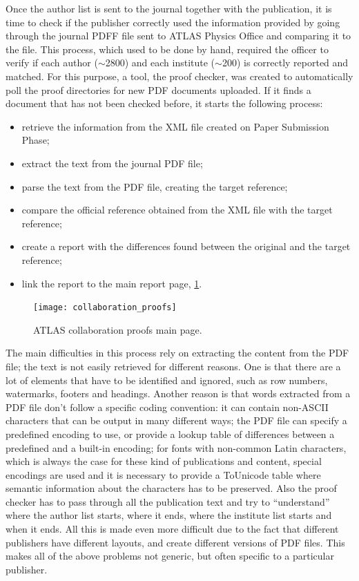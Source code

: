 Once the author list is sent to the journal together with the publication,
it is time to check if the publisher correctly used the information provided by going through the journal PDFF file sent to ATLAS Physics Office and comparing it to the  file.
This process, which used to be done by hand, required the officer to verify if each author ($\sim$2800) and each institute ($\sim$200) is correctly reported and matched. 
For this purpose, a tool, the proof checker, was created to automatically poll the proof directories for new PDF documents uploaded.
If it finds a document that has not been checked before, it starts the following process:

\begin{itemize}
\item retrieve the information from the XML file created on Paper Submission Phase;
\item extract the text from the journal PDF file;
\item parse the text from the PDF file, creating the target reference;
\item compare the official reference obtained from the XML file with the target reference;
\item create a report with the differences found between the original and the target reference;
\item link the report to the main report page, \cref{fig:collaboration_proofs}.
\end{itemize}

\begin{figure}[htb]
  \centering
  \texttt{[image: collaboration\_proofs]}
  \caption{ATLAS collaboration proofs main page.}
  \label{fig:collaboration_proofs}
\end{figure}

The main difficulties in this process rely on extracting the content from the PDF file; the text is not easily retrieved for different reasons. 
One is that there are a lot of elements that have to be identified and ignored, such as row numbers, watermarks, footers and headings. 
Another reason is that words extracted from a PDF file don’t follow a specific coding convention:
it can contain non-ASCII characters that can be output in many different ways;
the PDF file can specify a predefined encoding to use, or provide a lookup table of differences between a predefined and a built-in encoding;
for fonts with non-common Latin characters, which is always the case for these kind of publications and content,
special encodings are used and it is necessary to provide a ToUnicode table where semantic information about the characters has to be preserved. 
Also the proof checker has to pass through all the publication text and try to \enquote{understand} where the author list starts, where it ends, where the institute list starts and when it ends.
All this is made even more difficult due to the fact that different publishers have different layouts, and create different versions of PDF files.
This makes all of the above problems not generic,
but often specific to a particular publisher.

